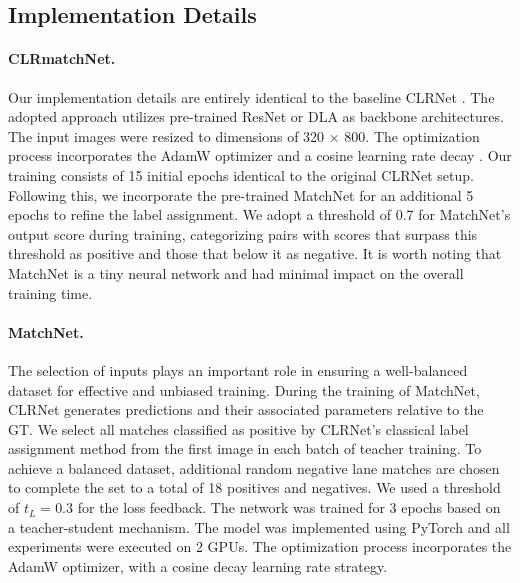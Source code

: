 \documentclass[10pt,twocolumn,letterpaper]{article}
\begin{document}
\subsection{Implementation Details}
\paragraph{CLRmatchNet.}Our implementation details are entirely identical to the baseline CLRNet \cite{CLRNet}. The adopted approach utilizes pre-trained ResNet \cite{resnet} or DLA \cite{DLA} as backbone architectures. The input images were resized to dimensions of 320 × 800. The optimization process incorporates the AdamW \cite{Adam} optimizer and a cosine learning rate decay \cite{Decay}. Our training consists of 15 initial epochs identical to the original CLRNet setup. Following this, we incorporate the pre-trained MatchNet for an additional 5 epochs to refine the label assignment. We adopt a threshold of 0.7 for MatchNet's output score during training, categorizing pairs with scores that surpass this threshold as positive and those that below it as negative. It is worth noting that MatchNet is a tiny neural network and had minimal impact on the overall training time.
 
\paragraph{\textbf{MatchNet.}} The selection of inputs plays an important role in ensuring a well-balanced dataset for effective and unbiased training. During the training of MatchNet, CLRNet generates predictions and their associated parameters relative to the GT. We select all matches classified as positive by CLRNet's classical label assignment method from the first image in each batch of teacher training. To achieve a balanced dataset, additional random negative lane matches are chosen to complete the set to a total of 18 positives and negatives. We used a threshold of $t_{L}=0.3$ for the loss feedback. The network was trained for 3 epochs based on a teacher-student mechanism. The model was implemented using PyTorch and all experiments were executed on 2 GPUs. The optimization process incorporates the AdamW optimizer, with a cosine decay learning rate strategy. 
 
\end{document}
